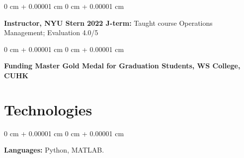 \documentclass[10pt, letterpaper]{article}
\newenvironment{onecolentry}{
    \begin{adjustwidth}{
        0 cm + 0.00001 cm
    }{
        0 cm + 0.00001 cm
    }
}{
    \end{adjustwidth}
} %
\begin{document}
        
        \begin{onecolentry}
            \textbf{Instructor, NYU Stern 2022 J-term:} Taught course Operations Management; Evaluation 4.0/5
        \end{onecolentry}


        
        \vspace{0.2 cm}

        \begin{onecolentry}
            \textbf{Funding Master Gold Medal for Graduation Students, WS College, CUHK
}
        \end{onecolentry}

    
    \section{Technologies}




        \begin{onecolentry}
            \textbf{Languages:} Python, MATLAB.
        \end{onecolentry}
        \vspace{0.2 cm}




    
\end{document}
